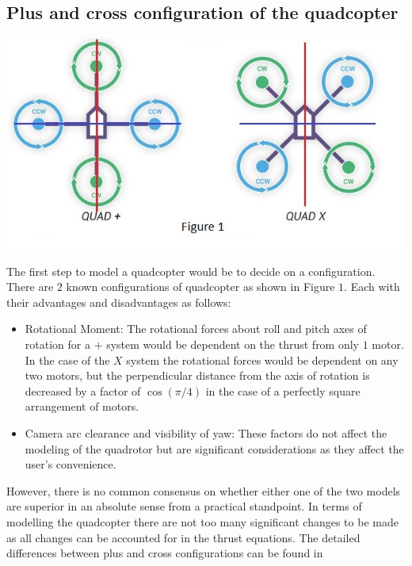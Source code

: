 \documentclass[9pt]{article}
\begin{document}
\subsection{Plus and cross configuration of the quadcopter}

\begin{center}
\includegraphics[width=1\textwidth]{1.jpg}
\end{center}

\noindent The first step to model a quadcopter would be to decide on a configuration. There are $2$ known configurations of quadcopter as shown in Figure $1$. Each with their advantages and disadvantages as follows:

\begin{itemize}

\item Rotational Moment: The rotational forces about roll and pitch axes of rotation for a $+$ system would be dependent on the thrust from only $1$ motor. In the case of the $X$ system the rotational forces would be dependent on any two motors, but the perpendicular distance from the axis of rotation is decreased by a factor of $\cos(\pi/4)$ in the case of a perfectly square arrangement of motors.

\item Camera arc clearance and visibility of yaw: These factors do not affect the modeling of the quadrotor but are significant considerations as they affect the user's convenience.

\end{itemize} 

\noindent However, there is no common consensus on whether either one of the two models are superior in an absolute sense from a practical standpoint. In terms of modelling the quadcopter there are not too many significant changes to be made as all changes can be accounted for in the thrust equations. The detailed differences between plus and cross configurations can be found in\cite{62431}
\end{document}
